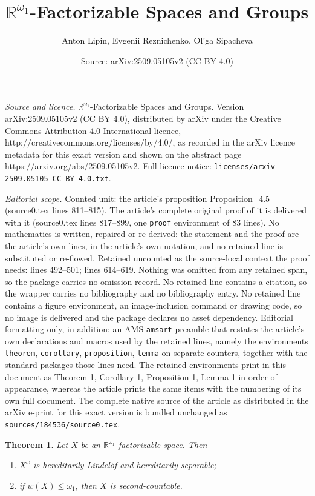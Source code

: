 \documentclass[10pt,a4paper]{amsart}
\title{$\mathbb R^{\omega_1}$-Factorizable Spaces and Groups}
\author{Anton Lipin, Evgenii Reznichenko, Ol'ga Sipacheva}
\date{Source: arXiv:2509.05105v2 (CC BY 4.0)}
\newtheorem{theorem}{Theorem}
\begin{document}
\maketitle

\noindent\emph{Source and licence.} $\mathbb R^{\omega_1}$-Factorizable Spaces and Groups. Version arXiv:2509.05105v2 (CC BY 4.0), distributed by arXiv under the Creative Commons Attribution 4.0 International licence, http://creativecommons.org/licenses/by/4.0/, as recorded in the arXiv licence metadata for this exact version and shown on the abstract page https://arxiv.org/abs/2509.05105v2. Full licence notice: \texttt{licenses/arxiv-2509.05105-CC-BY-4.0.txt}.\par\smallskip

\noindent\textit{Editorial scope.} Counted unit: the article's proposition Proposition\_4.5 (source0.tex lines 811--815). The article's complete original proof of it is delivered with it (source0.tex lines 817--899, one \texttt{proof} environment of 83 lines). No mathematics is written, repaired or re-derived: the statement and the proof are the article's own lines, in the article's own notation, and no retained line is substituted or re-flowed.  Retained uncounted as the source-local context the proof needs: lines 492--501; lines 614--619.  Nothing was omitted from any retained span, so the package carries no omission record.  No retained line contains a citation, so the wrapper carries no bibliography and no bibliography entry.  No retained line contains a figure environment, an image-inclusion command or drawing code, so no image is delivered and the package declares no asset dependency.  Editorial formatting only, in addition: an AMS \texttt{amsart} preamble that restates the article's own declarations and macros used by the retained lines, namely the environments \texttt{theorem}, \texttt{corollary}, \texttt{proposition}, \texttt{lemma} on separate counters, together with the standard packages those lines need.  The retained environments print in this document as Theorem 1, Corollary 1, Proposition 1, Lemma 1 in order of appearance, whereas the article prints the same items with the numbering of its own full document.  The complete native source of the article as distributed in the arXiv e-print for this exact version is bundled unchanged as \texttt{sources/184536/source0.tex}.
\begin{theorem}
\label{Theorem_3.2}
Let $X$ be an $\mathbb R^{\omega_1}$-factorizable space. Then
\begin{enumerate}
\item[\rm(1)]
$X^\omega$ is hereditarily Lindel\"of and hereditarily separable; 
\item[\rm(2)]
if $w(X)\leq\omega_1$, then $X$ is second-countable.
\end{enumerate}
\end{theorem}
\end{document}
